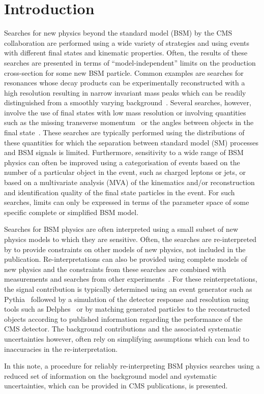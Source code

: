 \section{Introduction}
\label{sec:intro}

Searches for new physics beyond the standard model (BSM) by the CMS collaboration are performed using a wide variety of 
strategies and using events with different final states and kinematic properties.  Often, 
the results of these searches are presented in terms of ``model-independent'' limits on the production 
cross-section for some new BSM particle. Common examples are searches for resonances whose decay products 
can be experimentally reconstructed with a high resolution resulting in narrow invariant mass peaks which can be readily distinguished from 
a smoothly varying background~\cite{Khachatryan:2016yec}. Several searches, however, involve the use of final states with low mass resolution or involving 
quantities such as the missing transverse momentum~\cite{Khachatryan:2011tk,Khachatryan:2016mdm} or the angles between objects in the final state~\cite{Khachatryan:2015pua}. 
These searches are typically performed using the 
distributions of these quantities for which the separation between standard model (SM) processes and BSM signals is limited. Furthermore, 
sensitivity to a wide range of BSM physics can often be improved using a categorisation of events based on the number of a particular 
object in the event, such as charged leptons or jets, or based on a multivariate analysis (MVA) of the kinematics and/or reconstruction and 
identification quality of the final state particles in the event. For such searches, limits can only be expressed in terms of the 
parameter space of some specific complete or simplified BSM model.

Searches for BSM physics are often interpreted using a small subset of new physics 
models to which they are sensitive. Often, the searches are re-interpreted by 
to provide constraints on other models of new physics, not included in the publication.
Re-interpretations can also be provided using complete models of new physics and the constraints from 
these searches are combined with measurements and searches from other experiments~\cite{mastercode}. 
For these reinterpretations, the signal contribution is typically determined using an event generator 
such as {\sc Pythia}~\cite{pythia} followed by a simulation of the detector 
response and resolution using tools such as {\sc Delphes}~\cite{delphes} or by matching generated particles to
the reconstructed objects according to published information regarding the performance of the CMS detector. 
The background contributions and the associated systematic uncertainties however, often rely
on simplifying assumptions which can lead to inaccuracies in the re-interpretation. 

In this note, a procedure for reliably re-interpreting BSM physics searches using a reduced set of information
on the background model and systematic uncertainties, which can be provided in CMS publications, is presented.



